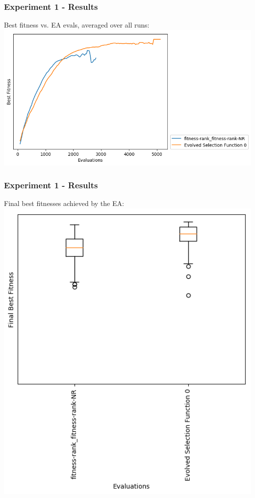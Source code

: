 \documentclass{beamer}
\begin{document}
	\begin{frame}
		\frametitle{Experiment 1 - Results}
		Best fitness vs. EA evals, averaged over all runs:		
		\includegraphics[width=\textwidth]{Experiment1LinePlot}
	\end{frame} 	
	
	\begin{frame}
		\frametitle{Experiment 1 - Results}
		\centering
		Final best fitnesses achieved by the EA:
		\includegraphics[height=0.8\textheight]{Experiment1Boxplot}
	\end{frame} 	
	
\end{document}
